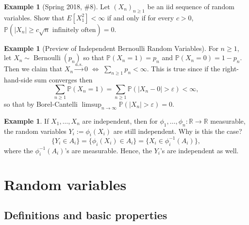 \documentclass[12pt,reqno]{article}
\theoremstyle{plain}
\theoremstyle{definition}
\newtheorem{example}[theorem]{Example}
\newcommand{\PP}[1]{\ensuremath{\mathbb{P}\left(#1\right)}}
\begin{document}
\begin{example}[Spring 2018, \#8]
Let $(X_n)_{n \geq 1}$ be an iid sequence of random variables. Show that 
$E[X_1^2] < \infty$ if and only if for every $c > 0$, 
$\PP{|X_n| \geq c\sqrt{n} \text{ infinitely often}} = 0$. 
\end{example} 

\begin{example}[Preview of Independent Bernoulli Random Variables] 
For $n \geq 1$, let $X_n \sim \operatorname{Bernoulli}(p_n)$ so that 
$\mathbb{P}(X_n = 1) = p_n$ and $\mathbb{P}(X_n = 0) = 1-p_n$. Then 
we claim that $X_n \xrightarrow{a.s.} 0$ $\iff$ 
$\sum_{n \geq 1} p_n < \infty$. This is true since if the right-hand-side 
sum converges then 
\[
\sum_{n \geq 1} \mathbb{P}(X_n = 1) = \sum_{n \geq 1} \mathbb{P}( 
     |X_n - 0| > \varepsilon) < \infty, 
\]
so that by Borel-Cantelli 
$\limsup_{n \rightarrow \infty} \mathbb{P}(|X_n| > \varepsilon) = 0$. 
\end{example} 

\begin{example}
If $X_1,\ldots,X_n$ are independent, then for 
$\phi_1,\ldots,\phi_n: \mathbb{R} \rightarrow \mathbb{R}$ measurable, 
the random variables $Y_i := \phi_i(X_i)$ are still independent. 
Why is this the case? 
\[
\{Y_i \in A_i\} = \{\phi_i(X_i) \in A_i\} = \{X_i \in \phi_i^{-1}(A_i)\}, 
\]
where the $\phi_i^{-1}(A_i)$'s are measurable. Hence, the $Y_i$'s are 
independent as well. 
\end{example} 

\newpage 
\section{Random variables} 

\subsection{Definitions and basic properties} 
\end{document}
